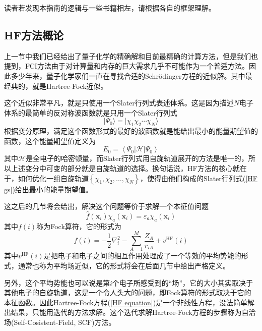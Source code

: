 \documentclass[12pt,a4paper,openany,twoside]{book}
\numberwithin{equation}{section}
\newcommand{\sch}{Schr\"odinger}
\begin{document}
        读者若发现本指南的逻辑与一些书籍相左，请根据各自的框架理解。
        \subsection{HF方法概论}
          上一节中我们已经给出了量子化学的精确解和目前最精确的计算方法，但是我们也提到，FCI方法由于对计算量和内存的巨大需求几乎不可能作为一个普适方法。因此多少年来，量子化学家们一直在寻找合适的\sch 方程的近似解。其中最经典的，就是Hartree-Fock近似。

          这个近似非常平凡，就是只使用一个Slater行列式表述体系。这是因为描述$N$电子体系的最简单的反对称波函数就是只用一个Slater行列式
          \begin{equation}
            | \Psi_{0} \rangle=| \chi_{1} \chi_{2} \cdots \chi_{N} \rangle
            \label{HF gs}
          \end{equation}
          根据变分原理，满足这个函数形式的最好的波函数就是能给出最小的能量期望值的函数，这个能量期望值定义为
          \begin{equation}
            E_{0}=\left\langle\Psi_{0}|\mathscr{H}| \Psi_{0}\right\rangle
            \label{HF energy}
          \end{equation}
          其中$\mathscr{H}$是全电子的哈密顿量，而Slater行列式用自旋轨道展开的方法是唯一的，所以上述变分中可变的部分就是自旋轨道的选择。换句话说，HF方法的核心就在于，如何优化一组自旋轨道$\left\{\chi_1,\chi_2,\dots,\chi_N\right\}$，使得由他们构成的Slater行列式(\ref{HF gs})给出最小的能量期望值。

          这之后的几节将会给出，解决这个问题等价于求解一个本征值问题
          \begin{equation}
            \hat{f}(\mathbf{x}_i)\chi_a(\mathbf{x}_i) = \varepsilon_a\chi_a(\mathbf{x}_i)
            \label{HF equation}
          \end{equation}
          其中$f(i)$称为Fock算符，它的形式为
          \begin{equation}
            f(i)=-\frac{1}{2} \nabla_{i}^{2}-\sum_{A=1}^{M} \frac{Z_{A}}{r_{i A}}+v^{\mathrm{HF}}(i)
          \end{equation}
          其中$v^{\mathrm{HF}}(i)$是把电子和电子之间的相互作用处理成了一个等效的平均势能的形式，通常也称为平均场近似，它的形式将会在后面几节中给出严格定义。
          
          另外，这个平均势能也可以说是第$i$个电子所感受到的“场”，它的大小其实取决于其他电子的自旋轨道，这是一个令人头大的问题，即Fock算符的形式取决于它的本征函数。因此Hartree-Fock方程(\ref{HF equation})是一个非线性方程，没法简单解出结果，只能用迭代的方法求解。这个迭代求解Hartree-Fock方程的步骤称为自洽场(Self-Cosistent-Field, SCF)方法。
\end{document}
